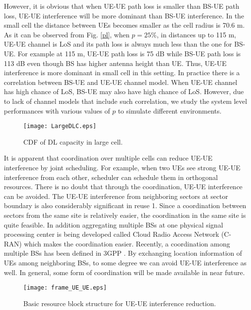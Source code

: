 \documentclass[twocolumn]{IEEEtran}
\begin{document}
However, it is obvious that when UE-UE path loss is smaller than
BS-UE path loss, UE-UE interference will be more dominant than BS-UE
interference. In the small cell the distance between UEs becomes
smaller as the cell radius is 70.6 m. As it can be observed from
Fig. \ref{pl}, when $p=25\%$, in distances up to 115 m, UE-UE
channel is LoS and its path loss is always much less than the one
for BS-UE. For example at 115 m, UE-UE path loss is 75 dB while
BS-UE path loss is 113 dB even though BS has higher antenna height
than  UE. Thus, UE-UE interference is more dominant in small cell in
this setting. In practice there is a correlation between BS-UE and
UE-UE channel model. When UE-UE channel has high chance of LoS,
BS-UE may also have high chance of LoS. However, due to lack of
channel models that include such correlation, we study the system
level performances with various values of $p$ to simulate different
environments.

\begin{figure}[!t]

\centering
    {\texttt{[image: LargeDLC.eps]}}


\caption{CDF of DL capacity in large cell. \label{LargeDL} }
\end{figure}

It is apparent that coordination over multiple cells can reduce
UE-UE interference by joint scheduling. For example, when two UEs
see strong UE-UE interference from each other, scheduler can
schedule them in orthogonal resources. There is no doubt that
through the coordination, UE-UE interference can be avoided. The
UE-UE interference from neighboring sectors at sector boundary is
also considerably significant in reuse 1. Since a coordination
between sectors from the same site is relatively easier, the
coordination in the same site is quite feasible. In addition
aggregating multiple BSs at one physical signal processing center is
being developed called Cloud Radio Access Network (C-RAN) which
makes the coordination easier. Recently, a coordination among
multiple BSs has been defined in 3GPP \cite{comp}. By exchanging
location information of UEs among neighboring BSs, to some degree we
can avoid UE-UE interference as well. In general, some form of
coordination will be made available in near future.


\begin{figure}[!t]

\centering
    {\texttt{[image: frame\_UE\_UE.eps]}}
\caption{Basic resource block structure for UE-UE interference
reduction. \label{frame_UE_UE} }

\end{figure}
\end{document}
